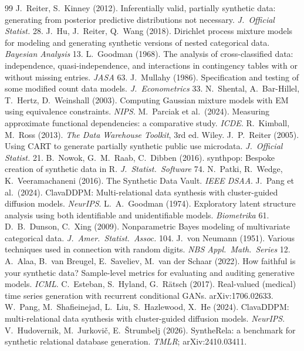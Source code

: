 \documentclass[11pt,a4paper]{article}
\theoremstyle{definition}
\theoremstyle{remark}
\begin{document}
\begin{thebibliography}{99}
 J.~Reiter, S.~Kinney (2012). Inferentially valid, partially synthetic data: generating from posterior predictive distributions not necessary. \emph{J.\ Official Statist.} 28.
 J.~Hu, J.~Reiter, Q.~Wang (2018). Dirichlet process mixture models for modeling and generating synthetic versions of nested categorical data. \emph{Bayesian Analysis} 13.
 L.~Goodman (1968). The analysis of cross-classified data: independence, quasi-independence, and interactions in contingency tables with or without missing entries. \emph{JASA} 63.
 J.~Mullahy (1986). Specification and testing of some modified count data models. \emph{J.\ Econometrics} 33.
 N.~Shental, A.~Bar-Hillel, T.~Hertz, D.~Weinshall (2003). Computing Gaussian mixture models with EM using equivalence constraints. \emph{NIPS}.
 M.~Parciak et al.\ (2024). Measuring approximate functional dependencies: a comparative study. \emph{ICDE}.
 R.~Kimball, M.~Ross (2013). \emph{The Data Warehouse Toolkit}, 3rd ed. Wiley.
 J.~P.~Reiter (2005). Using CART to generate partially synthetic public use microdata. \emph{J.\ Official Statist.} 21.
 B.~Nowok, G.~M.~Raab, C.~Dibben (2016). synthpop: Bespoke creation of synthetic data in R. \emph{J.\ Statist.\ Software} 74.
 N.~Patki, R.~Wedge, K.~Veeramachaneni (2016). The Synthetic Data Vault. \emph{IEEE DSAA}.
 J.~Pang et al.\ (2024). ClavaDDPM: Multi-relational data synthesis with cluster-guided diffusion models. \emph{NeurIPS}.
 L.~A.~Goodman (1974). Exploratory latent structure analysis using both identifiable and unidentifiable models. \emph{Biometrika} 61.
 D.~B.~Dunson, C.~Xing (2009). Nonparametric Bayes modeling of multivariate categorical data. \emph{J.\ Amer.\ Statist.\ Assoc.} 104.
 J.~von Neumann (1951). Various techniques used in connection with random digits. \emph{NBS Appl.\ Math.\ Series} 12.
 A.~Alaa, B.~van Breugel, E.~Saveliev, M.~van der Schaar (2022). How faithful is your synthetic data? Sample-level metrics for evaluating and auditing generative models. \emph{ICML}.
 C.~Esteban, S.~Hyland, G.~R\"atsch (2017). Real-valued (medical) time series generation with recurrent conditional GANs. arXiv:1706.02633.
 W.~Pang, M.~Shafieinejad, L.~Liu, S.~Hazlewood, X.~He (2024). ClavaDDPM: multi-relational data synthesis with cluster-guided diffusion models. \emph{NeurIPS}.
 V.~Hudovernik, M.~Jurkovi\v{c}, E.~\v{S}trumbelj (2026). SyntheRela: a benchmark for synthetic relational database generation. \emph{TMLR}; arXiv:2410.03411.

\end{thebibliography}
\end{document}
